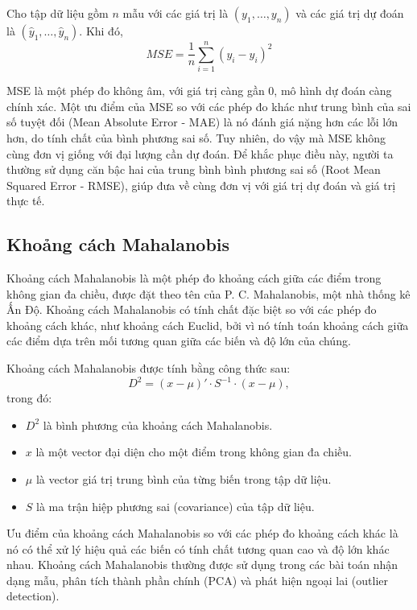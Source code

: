 \begin{definition}
	Cho tập dữ liệu gồm $n$ mẫu với các giá trị là $\left(y_1,\ldots,y_n\right)$ và các giá trị dự đoán là $\left(\hat{y}_1,\ldots,\hat{y}_n\right)$. Khi đó,
	\begin{equation*}
		MSE = \frac{1}{n}\sum\limits_{i=1}^n\left(y_i-\hat{y}_i \right)^2
	\end{equation*}
\end{definition}
MSE là một phép đo không âm, với giá trị càng gần 0, mô hình dự đoán càng chính xác. Một ưu điểm của MSE so với các phép đo khác như trung bình của sai số tuyệt đối (Mean Absolute Error - MAE) là nó đánh giá nặng hơn các lỗi lớn hơn, do tính chất của bình phương sai số. Tuy nhiên, do vậy mà MSE không cùng đơn vị giống với đại lượng cần dự đoán. Để khắc phục điều này, người ta thường sử dụng căn bậc hai của trung bình bình phương sai số (Root Mean Squared Error - RMSE), giúp đưa về cùng đơn vị với giá trị dự đoán và giá trị thực tế.

\subsection{Khoảng cách Mahalanobis}
Khoảng cách Mahalanobis là một phép đo khoảng cách giữa các điểm trong không gian đa chiều, được đặt theo tên của P. C. Mahalanobis, một nhà thống kê Ấn Độ. Khoảng cách Mahalanobis có tính chất đặc biệt so với các phép đo khoảng cách khác, như khoảng cách Euclid, bởi vì nó tính toán khoảng cách giữa các điểm dựa trên mối tương quan giữa các biến và độ lớn của chúng.

Khoảng cách Mahalanobis được tính bằng công thức sau:
\begin{equation}
	D^2 = \left(x-\mu\right)' \cdot S^{-1} \cdot \left(x-\mu\right),
\end{equation}
trong đó:
\begin{itemize}
	\item $D^2$ là bình phương của khoảng cách Mahalanobis.
	\item $x$ là một vector đại diện cho một điểm trong không gian đa chiều.
	\item $\mu$ là vector giá trị trung bình của từng biến trong tập dữ liệu.
	\item $S$ là ma trận hiệp phương sai (covariance) của tập dữ liệu.
\end{itemize}

Ưu điểm của khoảng cách Mahalanobis so với các phép đo khoảng cách khác là nó có thể xử lý hiệu quả các biến có tính chất tương quan cao và độ lớn khác nhau. Khoảng cách Mahalanobis thường được sử dụng trong các bài toán nhận dạng mẫu, phân tích thành phần chính (PCA) và phát hiện ngoại lai (outlier detection).

